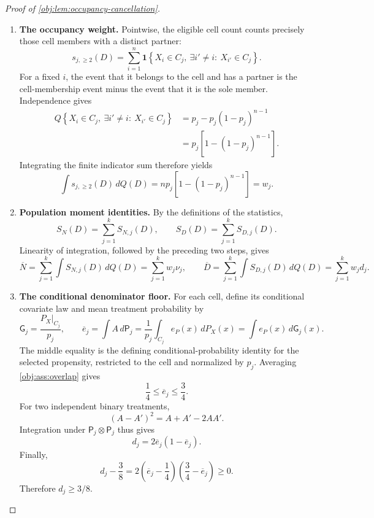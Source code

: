 \documentclass[11pt]{article}
\begin{document}
\begin{proof}[Proof of \cref{obj:lem:occupancy-cancellation}]
\begin{enumerate}
\item \textbf{The occupancy weight.}
Pointwise, the eligible cell count counts precisely those cell members with a distinct partner:
\[
s_{j,\ge2}(D)
=
\sum_{i=1}^n
\mathbf1\left\{
X_i\in C_j,\ 
\exists i'\ne i:\ X_{i'}\in C_j
\right\}.
\]
For a fixed \(i\), the event that it belongs to the cell and has a partner is the cell-membership event minus the event that it is the sole member. Independence gives
\[
\begin{aligned}
Q\left\{X_i\in C_j,\ 
 \exists i'\ne i:\ X_{i'}\in C_j\right\}
&=
p_j-p_j(1-p_j)^{n-1}\\
&=p_j\left[1-(1-p_j)^{n-1}\right].
\end{aligned}
\]
Integrating the finite indicator sum therefore yields
\[
\int s_{j,\ge2}(D)\,dQ(D)
=
np_j\left[1-(1-p_j)^{n-1}\right]
=w_j.
\]

\item \textbf{Population moment identities.}
By the definitions of the statistics,
\[
S_N(D)=\sum_{j=1}^k S_{N,j}(D),
\qquad
S_D(D)=\sum_{j=1}^k S_{D,j}(D).
\]
Linearity of integration, followed by the preceding two steps, gives
\[
\overline N
=\sum_{j=1}^k\int S_{N,j}(D)\,dQ(D)
=\sum_{j=1}^k w_j\nu_j,
\qquad
\overline D
=\sum_{j=1}^k\int S_{D,j}(D)\,dQ(D)
=\sum_{j=1}^k w_jd_j.
\]

\item \textbf{The conditional denominator floor.}
For each cell, define its conditional covariate law and mean treatment probability by
\[
\mathsf G_j=\frac{P_X|_{C_j}}{p_j},
\qquad
\overline e_j
=\int A\,d\mathsf P_j
=\frac{1}{p_j}\int_{C_j}e_P(x)\,dP_X(x)
=\int e_P(x)\,d\mathsf G_j(x).
\]
The middle equality is the defining conditional-probability identity for the selected propensity, restricted to the cell and normalized by \(p_j\). Averaging \cref{obj:ass:overlap} gives
\[
\frac14\le\overline e_j\le\frac34.
\]
For two independent binary treatments,
\[
(A-A')^2=A+A'-2AA'.
\]
Integration under \(\mathsf P_j\otimes\mathsf P_j\) thus gives
\[
d_j=2\overline e_j(1-\overline e_j).
\]
Finally,
\[
d_j-\frac38
=
2\left(\overline e_j-\frac14\right)
 \left(\frac34-\overline e_j\right)\ge0.
\]
Therefore \(d_j\ge3/8\).


\end{enumerate}
\end{proof}
\end{document}
